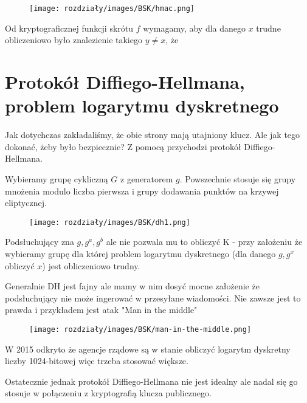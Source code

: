 \begin{figure}[H]
    \centering
    \texttt{[image: rozdziały/images/BSK/hmac.png]}
\end{figure}

\begin{problems}

    \prob Od kryptograficznej funkcji skrótu $f$ wymagamy, aby dla danego $x$ trudne obliczeniowo było znalezienie takiego $y\neq x$, że
    
\end{problems}    


\section{Protokół Diffiego-Hellmana, problem logarytmu dyskretnego}

Jak dotychczas zakładaliśmy, że obie strony mają utajniony klucz. Ale jak tego dokonać, żeby było bezpiecznie? Z pomocą przychodzi protokół Diffiego-Hellmana.

Wybieramy grupę cykliczną $G$ z generatorem $g$. Powszechnie stosuje się grupy mnożenia modulo liczba pierwsza i grupy dodawania punktów na krzywej eliptycznej.

\begin{figure}[H]
    \centering
    \texttt{[image: rozdziały/images/BSK/dh1.png]}
\end{figure}

Podsłuchujący zna $g, g^a, g^b$ ale nie pozwala mu to obliczyć K - przy założeniu że wybieramy grupę dla której problem logarytmu dyskretnego (dla danego $g, g^x$ obliczyć $x$) jest obliczeniowo trudny.

Generalnie DH jest fajny ale mamy w nim dosyć mocne założenie że podsłuchujący nie może ingerować w przesyłane wiadomości. Nie zawsze jest to prawda i przykładem jest atak "Man in the middle"

\begin{figure}[H]
    \centering
    \texttt{[image: rozdziały/images/BSK/man-in-the-middle.png]}
\end{figure}

W 2015 odkryto że agencje rządowe są w stanie obliczyć logarytm dyskretny liczby 1024-bitowej więc trzeba stosować większe.

Ostatecznie jednak protokół Diffiego-Hellmana nie jest idealny ale nadal się go stosuje w połączeniu z kryptografią klucza publicznego.


